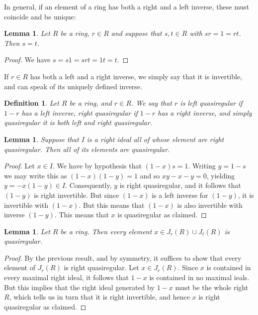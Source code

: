 \documentclass[12pt]{report}
\theoremstyle{plain}
\newtheorem{defn}[thm]{Definition}
\newtheorem{lem}[thm]{Lemma}
\begin{document}
In general, if an element of a ring has both a right and a left inverse,
these must coincide and be unique:
\begin{lem}
Let $R$ be a ring, $r \in R$ and suppose that $s, t \in R$ with $sr = 1 =
rt$. Then $s = t$.
\end{lem}
\begin{proof}
We have $s = s1 = srt = 1t = t$.
\end{proof}
If $r \in R$ has both a left and a right inverse, we simply say that it is
invertible, and can speak of its uniquely defined inverse.

\begin{defn}
Let $R$ be a ring, and $r \in R$. We say that $r$ is left quasiregular if
$1 - r$ has a left inverse, right quasiregular if $1 - r$ has a right
inverse, and simply quasiregular it is both left and right quasiregular. 
\end{defn}

\begin{lem}
Suppose that $I$ is a right ideal all of whose element are right
quasiregular. Then all of its elements are quasiregular.
\end{lem}
\begin{proof}
Let $x \in I$. We have by hypothesis that $(1 - x)s = 1$. Writing $y = 1 -
s$ we may write this as $(1 - x)(1 - y) = 1$ and so $xy - x - y = 0$,
yielding $y = -x(1 - y) \in I$. Consequently, $y$ is right quasiregular,
and it follows that $(1 - y)$ is right invertible. But since $(1 - x)$ is a
left inverse for $(1 - y)$, it is invertible with $(1 - x)$. But this means
that $(1 - x)$ is also invertible with inverse $(1 - y)$. This means that
$x$ is quasiregular as claimed.
\end{proof}

\begin{lem}
Let $R$ be a ring. Then every element $x \in J_r(R) \cup J_\ell(R)$ is
quasiregular.
\end{lem}
\begin{proof}
By the previous result, and by symmetry, it suffices to show that every
element of $J_r(R)$ is right quasiregular. Let $x \in J_r(R)$. Since $x$ is
contained in every maximal right ideal, it follows that $1 - x$ is
contained in no maximal ieals. But this implies that the right ideal
generated by $1 - x$ must be the whole right $R$, which tells us in turn
that it is right invertible, and hence $x$ is right quasiregular as
claimed.
\end{proof}
\end{document}
